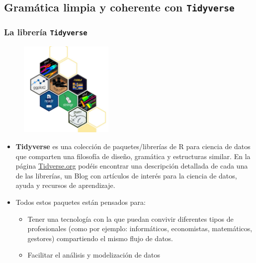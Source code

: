 \documentclass[
  letterpaper,
  DIV=11,
  numbers=noendperiod]{scrreprt}
\begin{document}
\hypertarget{gramuxe1tica-limpia-y-coherente-con-tidyverse}{%
\subsection{\texorpdfstring{Gramática limpia y coherente con
\texttt{Tidyverse}}{Gramática limpia y coherente con Tidyverse}}\label{gramuxe1tica-limpia-y-coherente-con-tidyverse}}

\hypertarget{la-libreruxeda-tidyverse}{%
\subsubsection{\texorpdfstring{La librería
\texttt{Tidyverse}}{La librería Tidyverse}}\label{la-libreruxeda-tidyverse}}

\begin{figure}

{\centering \includegraphics[width=0.4\textwidth,height=\textheight]{Figuras/tidyverse-hex.PNG}

}

\end{figure}

\begin{itemize}
\item
  \textbf{Tidyverse} es una colección de paquetes/librerías de R para
  ciencia de datos que comparten una filosofía de diseño, gramática y
  estructuras similar. En la página
  \href{https://www.tidyverse.org/}{Tidverse.org} podéis encontrar una
  descripción detallada de cada una de las librerías, un Blog con
  artículos de interés para la ciencia de datos, ayuda y recursos de
  aprendizaje.
\item
  Todos estos paquetes están pensados para:

  \begin{itemize}
  \item
    Tener una tecnología con la que puedan convivir diferentes tipos de
    profesionales (como por ejemplo: informáticos, economistas,
    matemáticos, gestores) compartiendo el mismo flujo de datos.
  \item
    Facilitar el análisis y modelización de datos
  \end{itemize}
\end{itemize}
\end{document}
